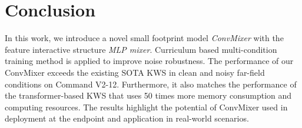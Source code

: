 \documentclass{article}
\begin{document}
\section{Conclusion}
\label{sec:conclusion}
In this work, we introduce a novel small footprint model \textit{ConvMixer} with the feature interactive structure \textit{MLP mixer}. 
Curriculum based multi-condition training method is applied to improve noise robustness. 
The performance of our ConvMixer exceeds the existing SOTA KWS in clean and noisy far-field conditions on Command V2-12. Furthermore, it also matches the performance of the transformer-based KWS that uses 50 times more memory consumption and computing resources.
The results highlight the potential of ConvMixer used in deployment at the endpoint and application in real-world scenarios.















\end{document}
